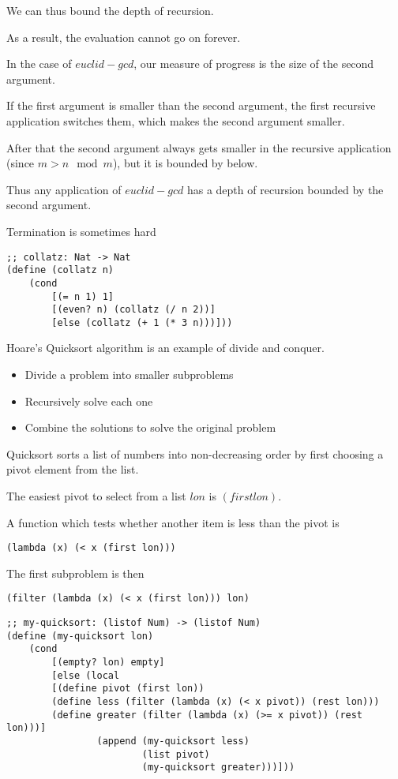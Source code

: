 \documentclass{article}
\begin{document}
We can thus bound the depth of recursion. 

As a result, the evaluation cannot go on forever.

In the case of $euclid-gcd$, our measure of progress is the size of the second argument. 

If the first argument is smaller than the second argument, the first recursive application switches them, which makes the second argument smaller. 

After that the second argument always gets smaller in the recursive application (since $m > n \mod m$), but it is bounded by below. 

Thus any application of $euclid-gcd$ has a depth of recursion bounded by the second argument. 

Termination is sometimes hard

\begin{lstlisting}
;; collatz: Nat -> Nat
(define (collatz n)
    (cond
        [(= n 1) 1]
        [(even? n) (collatz (/ n 2))]
        [else (collatz (+ 1 (* 3 n)))]))
\end{lstlisting}

Hoare's Quicksort algorithm is an example of divide and conquer. 
\begin{itemize}
    \item Divide a problem into smaller subproblems
    \item Recursively solve each one
    \item Combine the solutions to solve the original problem
\end{itemize}

Quicksort sorts a list of numbers into non-decreasing order by first choosing a pivot element from the list. 

The easiest pivot to select from a list $lon$ is $(first lon)$. 

A function which tests whether another item is less than the pivot is 
\begin{lstlisting}
(lambda (x) (< x (first lon)))
\end{lstlisting}

The first subproblem is then
\begin{lstlisting}
(filter (lambda (x) (< x (first lon))) lon)
\end{lstlisting}

\begin{lstlisting}
;; my-quicksort: (listof Num) -> (listof Num) 
(define (my-quicksort lon)
    (cond 
        [(empty? lon) empty]
        [else (local 
        [(define pivot (first lon))
        (define less (filter (lambda (x) (< x pivot)) (rest lon)))
        (define greater (filter (lambda (x) (>= x pivot)) (rest lon)))]
                (append (my-quicksort less)
                        (list pivot)
                        (my-quicksort greater)))]))
\end{lstlisting}
\end{document}

